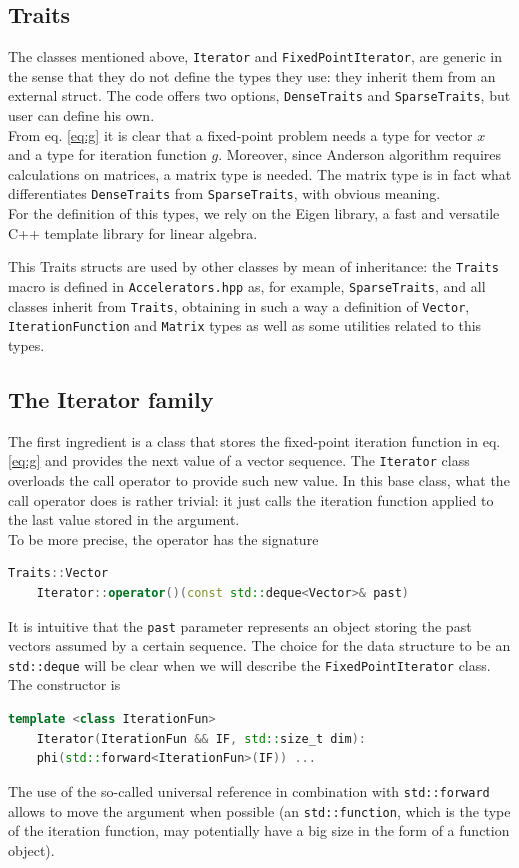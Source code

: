\documentclass[12pt]{article}
\begin{document}
		\subsection{Traits}
		The classes mentioned above, \verb|Iterator| and \verb|FixedPointIterator|, are generic in the sense that
		they do not define the types they use: they inherit them from an external struct.
		The code offers two options, \verb|DenseTraits| and \verb|SparseTraits|, but user can define his own.\\
		From eq. \ref{eq:g} it is clear that a fixed-point problem needs a type for vector $x$ and a type for iteration function $g$.
		Moreover, since Anderson algorithm requires calculations on matrices, a matrix type is needed.
		The matrix type is in fact what differentiates \verb|DenseTraits| from \verb|SparseTraits|,
		with obvious meaning.\\
		For the definition of this types, we rely on the Eigen library, a fast and versatile
		C++ template library for linear algebra. 
		
		This Traits structs are used by other classes by mean of inheritance: the \verb|Traits| macro
		is defined in \verb|Accelerators.hpp| as, for example, \verb|SparseTraits|, and all classes inherit
		from \verb|Traits|, obtaining in such a way a definition of \verb|Vector|, \verb|IterationFunction| and \verb|Matrix| types
		as well as some utilities related to this types.
		
		
		\subsection{The Iterator family}
		The first ingredient is a class that stores the fixed-point iteration function in eq. \ref{eq:g} and provides the next value
		of a vector sequence. The \verb|Iterator| class overloads the call
		operator to provide such new value. In this base class, what the call operator does is rather trivial:
		it just calls the iteration function applied to the last value stored in the argument.\\
		To be more precise, the operator has the signature
		\begin{lstlisting}[language=C++]
	Traits::Vector
	Iterator::operator()(const std::deque<Vector>& past)
		\end{lstlisting}
		It is intuitive that the \verb|past| parameter represents an object storing the past vectors assumed by a certain sequence.
		The choice for the data structure to be an \verb|std::deque| will be clear when we will describe the \verb|FixedPointIterator| class.\\
		The constructor is
		\begin{lstlisting}[language=C++]
	template <class IterationFun>
	Iterator(IterationFun && IF, std::size_t dim):
	phi(std::forward<IterationFun>(IF)) ...
		\end{lstlisting}
		The use of the so-called universal reference in combination with \verb|std::forward|
		allows to move the argument when possible (an \verb|std::function|, which is the type of the iteration function,
		may potentially have a big size in the form of a function object).
		
\end{document}
